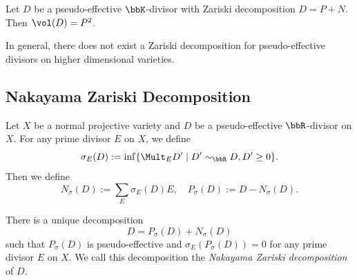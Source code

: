   \begin{corollary}
    Let $D$ be a pseudo-effective $\bbK$-divisor with Zariski decomposition $D = P + N$.
    Then $\vol(D) = P^2$.
   \Yang{}
  \end{corollary}


  \begin{proposition}
    In general, there does not exist a Zariski decomposition for pseudo-effective divisors on higher dimensional varieties.
   \Yang{}
  \end{proposition}

  \begin{example}
    \Yang{}
  \end{example}


\subsection{Nakayama Zariski Decomposition}

  Let $X$ be a normal projective variety and $D$ be a pseudo-effective $\bbR$-divisor on $X$. For any prime divisor $E$ on $X$, we define
  \[ \sigma_E(D) := \inf \{ \Mult_E D' \mid D' \sim_\bbR D, D' \geq 0 \}. \]
  Then we define
  \[ N_\sigma(D) := \sum_E \sigma_E(D) E, \quad P_\sigma(D) := D - N_\sigma(D). \]


  \begin{theorem}
    There is a unique decomposition
    \[ D = P_\sigma(D) + N_\sigma(D) \]
    such that $P_\sigma(D)$ is pseudo-effective and $\sigma_E(P_\sigma(D)) = 0$ for any prime divisor $E$ on $X$. 
    We call this decomposition the \emph{Nakayama Zariski decomposition} of $D$.

    \Yang{}
  \end{theorem}


